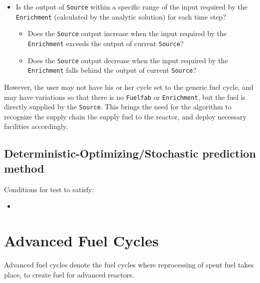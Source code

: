 \documentclass[12pt,letterpaper]{article}
\begin{document}
\begin{itemize}
\item Is the output of \texttt{Source} within a specific range of the input required by the \texttt{Enrichment} (calculated by the analytic solution) for each time step? 
\begin{itemize}
\item Does the \texttt{Source} output increase when the input required by the \texttt{Enrichment} exceeds the output of current \texttt{Source}?
\item Does the \texttt{Source} output decrease when the input required by the \texttt{Enrichment} falls behind the output of current \texttt{Source}?
\end{itemize}


\end{itemize}


However, the user may not have his or her cycle set to the generic fuel cycle, and may have
variations so that there is no \texttt{Fuelfab} or \texttt{Enrichment}, but the fuel is
directly supplied by the \texttt{Source}. This brings the need for the algorithm to recognize
the supply chain the supply fuel to the reactor, and deploy necessary facilities accordingly. 


\subsection*{Deterministic-Optimizing/Stochastic prediction method}
Conditions for test to satisfy: 
\begin{itemize}
\item 
\end{itemize}


\section{Advanced Fuel Cycles}
Advanced fuel cycles denote the fuel cycles
where reprocessing of spent fuel takes place,
to create fuel for advanced reactors. 
\end{document}
